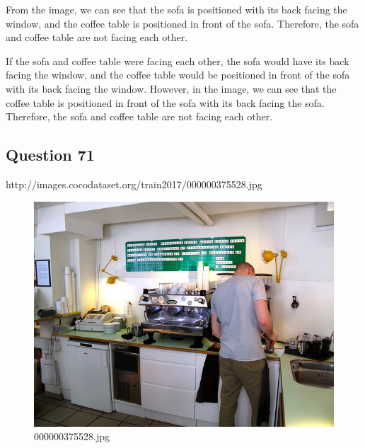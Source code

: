 \begin{enumerate}
    From the image, we can see that the sofa is positioned with its back facing the window, and the coffee table is positioned in front of the sofa. Therefore, the sofa and coffee table are not facing each other.
    
    If the sofa and coffee table were facing each other, the sofa would have its back facing the window, and the coffee table would be positioned in front of the sofa with its back facing the window. However, in the image, we can see that the coffee table is positioned in front of the sofa with its back facing the sofa. Therefore, the sofa and coffee table are not facing each other.
\end{enumerate}
\subsection*{Question 71}
http://images.cocodataset.org/train2017/000000375528.jpg
\begin{figure}[h]
    \centering
    \includegraphics[width=0.8\linewidth]{../image set/hard/000000375528.jpg}
    \caption{000000375528.jpg}
\end{figure}
